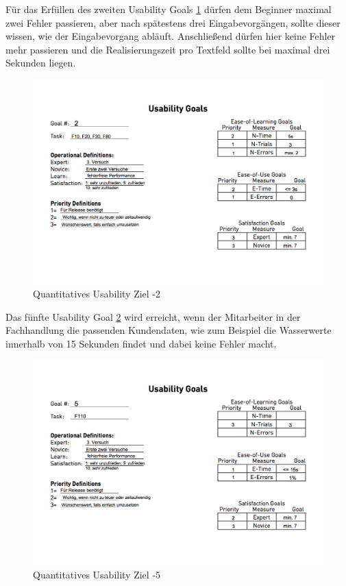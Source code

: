 Für das Erfüllen des zweiten Usability Goals \ref{ugoals:2} dürfen dem Beginner maximal zwei Fehler passieren, aber nach spätestens drei Eingabevorgängen, sollte dieser wissen, wie der Eingabevorgang abläuft. Anschließend dürfen hier keine Fehler mehr passieren und die Realisierungszeit pro Textfeld sollte bei maximal drei Sekunden liegen.

\begin{figure}
	\centering
	\includegraphics[width=\textwidth,height=\textheight,
keepaspectratio]{Usagoalstask2}
	\caption{Quantitatives Usability Ziel -2}
	\label{ugoals:2}
\end{figure}

Das fünfte Usability Goal \ref{ugoals:5} wird erreicht, wenn der Mitarbeiter in der Fachhandlung die passenden Kundendaten, wie zum Beispiel die Wasserwerte innerhalb von 15 Sekunden findet und dabei keine Fehler macht. 

\begin{figure}
	\centering
	\includegraphics[width=\textwidth,height=\textheight,
keepaspectratio]{Usagoalstask5}
	\caption{Quantitatives Usability Ziel -5}
	\label{ugoals:5}
\end{figure}



